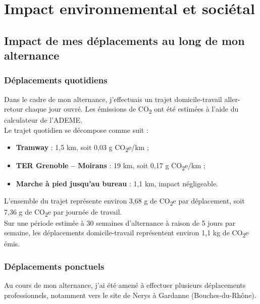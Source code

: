 \documentclass[a4paper, 11pt]{article}
\begin{document}
\newpage
\section{Impact environnemental et sociétal}

\subsection{Impact de mes déplacements au long de mon alternance}

\subsubsection{Déplacements quotidiens}

Dans le cadre de mon alternance, j'effectuais un trajet domicile-travail aller-retour chaque jour ouvré. Les émissions de CO\textsubscript{2} ont été estimées à l'aide du calculateur de l'ADEME.\\

Le trajet quotidien se décompose comme suit :\\

\begin{itemize}
\item[$\bullet$] \textbf{Tramway} : 1,5 km, soit 0,03 g CO\textsubscript{2}e/km ;
\item[$\bullet$] \textbf{TER Grenoble -- Moirans} : 19 km, soit 0,17 g CO\textsubscript{2}e/km ;
\item[$\bullet$] \textbf{Marche à pied jusqu'au bureau} : 1,1 km, impact négligeable.
\end{itemize}
\par\bigskip

L'ensemble du trajet représente environ 3,68 g de CO\textsubscript{2}e par déplacement, soit 7,36 g de CO\textsubscript{2}e par journée de travail.\\

Sur une période estimée à 30 semaines d'alternance à raison de 5 jours par semaine, les déplacements domicile-travail représentent environ 1,1 kg de CO\textsubscript{2}e émis.

\subsubsection{Déplacements ponctuels}

Au cours de mon alternance, j'ai été amené à effectuer plusieurs déplacements professionnels, notamment vers le site de Nerys à Gardanne (Bouches-du-Rhône).\\
\end{document}
